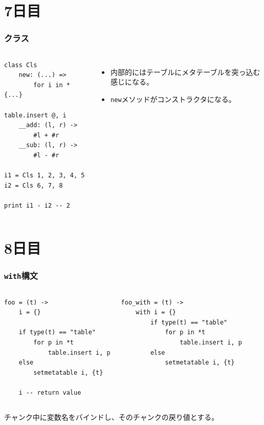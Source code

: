\section{7日目}
\begin{frame}[fragile]
\frametitle{クラス}
\begin{columns}
	\column[t]{.5\hsize}
	\begin{lstlisting}[numbers=none,language=MoonScript]
class Cls
	new: (...) =>
		for i in *{...}
			table.insert @, i
	__add: (l, r) ->
		#l + #r
	__sub: (l, r) ->
		#l - #r

i1 = Cls 1, 2, 3, 4, 5
i2 = Cls 6, 7, 8

print i1 - i2 -- 2
	\end{lstlisting}
	\column[t]{.5\hsize}
	\begin{itemize}
		\item 内部的にはテーブルにメタテーブルを突っ込む感じになる。
		\item \lstinline|new|メソッドがコンストラクタになる。
	\end{itemize}
\end{columns}
\end{frame}
\section{8日目}
\begin{frame}[fragile]
	\frametitle{\lstinline|with|構文}
	\begin{columns}
		\footnotesize
		\column[t]{.49\hsize}
		\begin{lstlisting}[numbers=none,language=MoonScript]
foo = (t) ->
	i = {}

	if type(t) == "table"
		for p in *t
			table.insert i, p
	else
		setmetatable i, {t}
	
	i -- return value
		\end{lstlisting}
		\pause
		\column[t]{.01\hsize}
		\vfill
		\structure{\normalsize{}$\Rightarrow$}
		\column[t]{.49\hsize}
		\begin{lstlisting}[numbers=none,language=MoonScript]
foo_with = (t) ->
	with i = {}
		if type(t) == "table"
			for p in *t
				table.insert i, p
		else
			setmetatable i, {t}
		\end{lstlisting}
	\end{columns}
	\vspace{2\zw}

	チャンク中に変数名をバインドし、そのチャンクの戻り値とする。
\end{frame}
